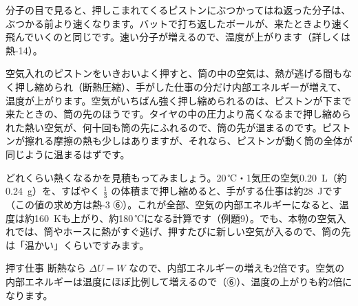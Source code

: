 \noindent\begin{minipage}[c]{0.36\linewidth}\centering
{}
\end{minipage}\hfill
\begin{minipage}[c]{0.6\linewidth}\raggedright
分子の目で見ると、押しこまれてくるピストンにぶつかってはね返った分子は、ぶつかる前より速くなります。バットで打ち返したボールが、来たときより速く飛んでいくのと同じです。速い分子が増えるので、温度が上がります（詳しくは熱-14）。
\end{minipage}\par\vspace{4pt}

空気入れのピストンをいきおいよく押すと、筒の中の空気は、熱が逃げる間もなく押し縮められ（断熱圧縮）、手がした仕事の分だけ内部エネルギーが増えて、温度が上がります。空気がいちばん強く押し縮められるのは、ピストンが下まで来たときの、筒の先のほうです。タイヤの中の圧力より高くなるまで押し縮められた熱い空気が、何十回も筒の先にふれるので、筒の先が温まるのです。ピストンが擦れる摩擦の熱も少しはありますが、それなら、ピストンが動く筒の全体が同じように温まるはずです。

どれくらい熱くなるかを見積もってみましょう。20\,℃・1気圧の空気\qty{0.20}{L}（約\qty{0.24}{g}）を、すばやく $\tfrac{1}{3}$ の体積まで押し縮めると、手がする仕事は約\qty{28}{J}です（この値の求め方は熱-3 ⑥）。これが全部、空気の内部エネルギーになると、温度は約\qty{160}{K}も上がり、約180\,℃になる計算です（例題9）。でも、本物の空気入れでは、筒やホースに熱がすぐ逃げ、押すたびに新しい空気が入るので、筒の先は「温かい」くらいですみます。

\begin{phbaisuru}{押す仕事}
断熱なら $\Delta U=W$ なので、内部エネルギーの増えも2倍です。空気の内部エネルギーは温度にほぼ比例して増えるので（⑥）、温度の上がりも約2倍になります。
\end{phbaisuru}

